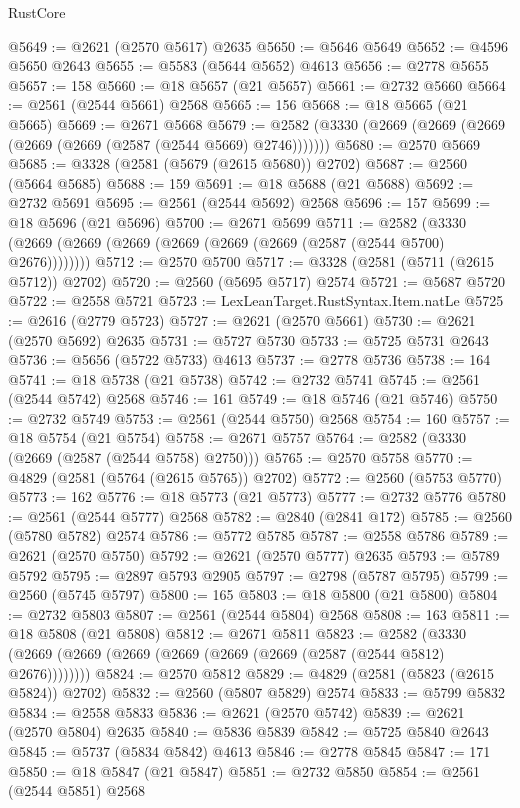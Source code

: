\begin{lexlean}{RustCore}
\begin{coremodule}
@5649 := @2621 (@2570 @5617) @2635
@5650 := @5646 @5649
@5652 := @4596 @5650 @2643
@5655 := @5583 (@5644 @5652) @4613
@5656 := @2778 @5655
@5657 := 158
@5660 := @18 @5657 (@21 @5657)
@5661 := @2732 @5660
@5664 := @2561 (@2544 @5661) @2568
@5665 := 156
@5668 := @18 @5665 (@21 @5665)
@5669 := @2671 @5668
@5679 := @2582 (@3330 (@2669 (@2669 (@2669 (@2669 (@2669 (@2587 (@2544 @5669) @2746)))))))
@5680 := @2570 @5669
@5685 := @3328 (@2581 (@5679 (@2615 @5680)) @2702)
@5687 := @2560 (@5664 @5685)
@5688 := 159
@5691 := @18 @5688 (@21 @5688)
@5692 := @2732 @5691
@5695 := @2561 (@2544 @5692) @2568
@5696 := 157
@5699 := @18 @5696 (@21 @5696)
@5700 := @2671 @5699
@5711 := @2582 (@3330 (@2669 (@2669 (@2669 (@2669 (@2669 (@2669 (@2587 (@2544 @5700) @2676))))))))
@5712 := @2570 @5700
@5717 := @3328 (@2581 (@5711 (@2615 @5712)) @2702)
@5720 := @2560 (@5695 @5717) @2574
@5721 := @5687 @5720
@5722 := @2558 @5721
@5723 := LexLeanTarget.RustSyntax.Item.natLe
@5725 := @2616 (@2779 @5723)
@5727 := @2621 (@2570 @5661)
@5730 := @2621 (@2570 @5692) @2635
@5731 := @5727 @5730
@5733 := @5725 @5731 @2643
@5736 := @5656 (@5722 @5733) @4613
@5737 := @2778 @5736
@5738 := 164
@5741 := @18 @5738 (@21 @5738)
@5742 := @2732 @5741
@5745 := @2561 (@2544 @5742) @2568
@5746 := 161
@5749 := @18 @5746 (@21 @5746)
@5750 := @2732 @5749
@5753 := @2561 (@2544 @5750) @2568
@5754 := 160
@5757 := @18 @5754 (@21 @5754)
@5758 := @2671 @5757
@5764 := @2582 (@3330 (@2669 (@2587 (@2544 @5758) @2750)))
@5765 := @2570 @5758
@5770 := @4829 (@2581 (@5764 (@2615 @5765)) @2702)
@5772 := @2560 (@5753 @5770)
@5773 := 162
@5776 := @18 @5773 (@21 @5773)
@5777 := @2732 @5776
@5780 := @2561 (@2544 @5777) @2568
@5782 := @2840 (@2841 @172)
@5785 := @2560 (@5780 @5782) @2574
@5786 := @5772 @5785
@5787 := @2558 @5786
@5789 := @2621 (@2570 @5750)
@5792 := @2621 (@2570 @5777) @2635
@5793 := @5789 @5792
@5795 := @2897 @5793 @2905
@5797 := @2798 (@5787 @5795)
@5799 := @2560 (@5745 @5797)
@5800 := 165
@5803 := @18 @5800 (@21 @5800)
@5804 := @2732 @5803
@5807 := @2561 (@2544 @5804) @2568
@5808 := 163
@5811 := @18 @5808 (@21 @5808)
@5812 := @2671 @5811
@5823 := @2582 (@3330 (@2669 (@2669 (@2669 (@2669 (@2669 (@2669 (@2587 (@2544 @5812) @2676))))))))
@5824 := @2570 @5812
@5829 := @4829 (@2581 (@5823 (@2615 @5824)) @2702)
@5832 := @2560 (@5807 @5829) @2574
@5833 := @5799 @5832
@5834 := @2558 @5833
@5836 := @2621 (@2570 @5742)
@5839 := @2621 (@2570 @5804) @2635
@5840 := @5836 @5839
@5842 := @5725 @5840 @2643
@5845 := @5737 (@5834 @5842) @4613
@5846 := @2778 @5845
@5847 := 171
@5850 := @18 @5847 (@21 @5847)
@5851 := @2732 @5850
@5854 := @2561 (@2544 @5851) @2568

\end{coremodule}
\end{lexlean}
